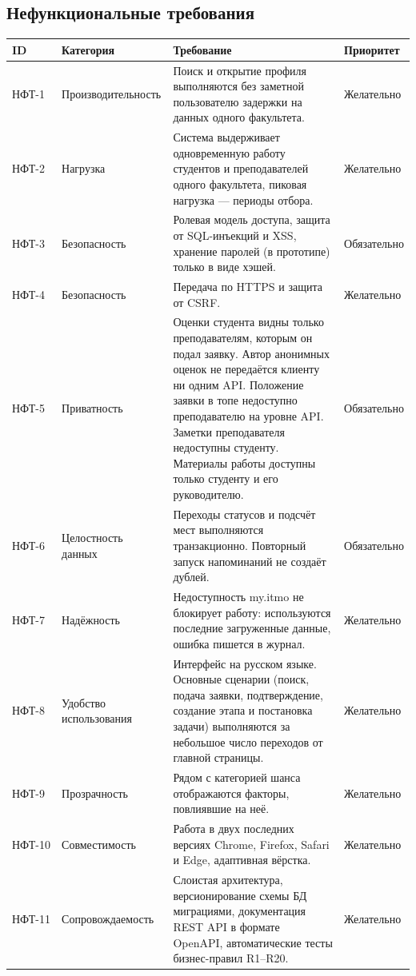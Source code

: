 \documentclass[a4paper,12pt]{article}
\begin{document}
\subsection{Нефункциональные требования}
{\small
\begin{longtable}{|p{1.4cm}|p{2.6cm}|p{8.5cm}|p{2.2cm}|}
\hline
\textbf{ID} & \textbf{Категория} & \textbf{Требование} & \textbf{Приоритет}\\ \hline
\endhead
НФТ-1 & Производительность & Поиск и открытие профиля выполняются без заметной пользователю задержки на данных одного факультета. & Желательно\\ \hline
НФТ-2 & Нагрузка & Система выдерживает одновременную работу студентов и преподавателей одного факультета, пиковая нагрузка — периоды отбора. & Желательно\\ \hline
НФТ-3 & Безопасность & Ролевая модель доступа, защита от SQL-инъекций и XSS, хранение паролей (в прототипе) только в виде хэшей. & Обязательно\\ \hline
НФТ-4 & Безопасность & Передача по HTTPS и защита от CSRF. & Желательно\\ \hline
НФТ-5 & Приватность & Оценки студента видны только преподавателям, которым он подал заявку. Автор анонимных оценок не передаётся клиенту ни одним API. Положение заявки в топе недоступно преподавателю на уровне API. Заметки преподавателя недоступны студенту. Материалы работы доступны только студенту и его руководителю. & Обязательно\\ \hline
НФТ-6 & Целостность данных & Переходы статусов и подсчёт мест выполняются транзакционно. Повторный запуск напоминаний не создаёт дублей. & Обязательно\\ \hline
НФТ-7 & Надёжность & Недоступность my.itmo не блокирует работу: используются последние загруженные данные, ошибка пишется в журнал. & Желательно\\ \hline
НФТ-8 & Удобство использования & Интерфейс на русском языке. Основные сценарии (поиск, подача заявки, подтверждение, создание этапа и постановка задачи) выполняются за небольшое число переходов от главной страницы. & Желательно\\ \hline
НФТ-9 & Прозрачность & Рядом с категорией шанса отображаются факторы, повлиявшие на неё. & Желательно\\ \hline
НФТ-10 & Совместимость & Работа в двух последних версиях Chrome, Firefox, Safari и Edge, адаптивная вёрстка. & Желательно\\ \hline
НФТ-11 & Сопровождаемость & Слоистая архитектура, версионирование схемы БД миграциями, документация REST API в формате OpenAPI, автоматические тесты бизнес-правил R1–R20. & Желательно\\ \hline

\end{longtable}}
\end{document}
